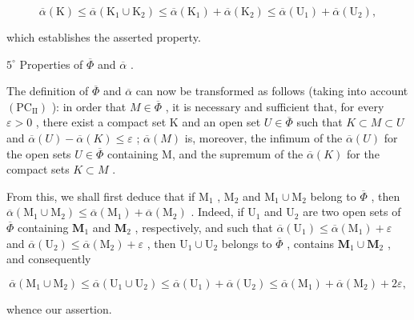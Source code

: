 \[
\overline {{{{\alpha}}}} (\mathrm{K}) \leqslant \overline {{{{\alpha}}}} (\mathrm{K} _ {1} \cup \mathrm{K} _ {2}) \leqslant \overline {{{{\alpha}}}} (\mathrm{K} _ {1}) + \overline {{{{\alpha}}}} (\mathrm{K} _ {2}) \leqslant \overline {{{{\alpha}}}} (\mathrm{U} _ {1}) + \overline {{{{\alpha}}}} (\mathrm{U} _ {2}),
\]

which establishes the asserted property.

\(5^{\circ}\) Properties of \(\overline{\Phi}\) and \(\overline{\alpha}\) .

The definition of \(\overline{\Phi}\) and \(\overline{\alpha}\) can now be transformed as follows (taking into account \((\mathrm{PC}_{\mathrm{II}})\) ): in order that \(M \in \overline{\Phi}\) , it is necessary and sufficient that, for every \(\varepsilon > 0\) , there exist a compact set K and an open set \(U \in \overline{\Phi}\) such that \(K \subset M \subset U\) and \(\overline{\alpha}(U) - \overline{\alpha}(K) \leqslant \varepsilon\) ; \(\overline{\alpha}(M)\) is, moreover, the infimum of the \(\overline{\alpha}(U)\) for the open sets \(U \in \overline{\Phi}\) containing M, and the supremum of the \(\overline{\alpha}(K)\) for the compact sets \(K \subset M\) .

From this, we shall first deduce that if \(\mathrm{M}_1\) , \(\mathrm{M}_2\) and \(\mathrm{M}_1 \cup \mathrm{M}_2\) belong to \(\overline{\Phi}\) , then \(\overline{\alpha}(\mathrm{M}_1 \cup \mathrm{M}_2) \leqslant \overline{\alpha}(\mathrm{M}_1) + \overline{\alpha}(\mathrm{M}_2)\) . Indeed, if \(\mathrm{U}_1\) and \(\mathrm{U}_2\) are two open sets of \(\overline{\Phi}\) containing \(\mathbf{M}_1\) and \(\mathbf{M}_2\) , respectively, and such that \(\overline{\alpha} (\mathrm{U}_1)\leqslant \overline{\alpha} (\mathrm{M}_1) + \varepsilon\) and \(\overline{\alpha} (\mathrm{U}_2)\leqslant \overline{\alpha} (\mathrm{M}_2) + \varepsilon\) , then \(\mathrm{U}_1\cup \mathrm{U}_2\) belongs to \(\overline{\Phi}\) , contains \(\mathbf{M}_1\cup \mathbf{M}_2\) , and consequently

\[
\overline {{\alpha}} \left(\mathrm{M} _ {1} \cup \mathrm{M} _ {2}\right) \leqslant \overline {{\alpha}} \left(\mathrm{U} _ {1} \cup \mathrm{U} _ {2}\right) \leqslant \overline {{\alpha}} \left(\mathrm{U} _ {1}\right) + \overline {{\alpha}} \left(\mathrm{U} _ {2}\right) \leqslant \overline {{\alpha}} \left(\mathrm{M} _ {1}\right) + \overline {{\alpha}} \left(\mathrm{M} _ {2}\right) + 2 \varepsilon ,
\]

whence our assertion.

